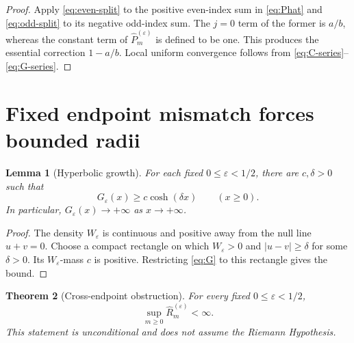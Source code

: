 \documentclass[11pt]{amsart}
\newtheorem{theorem}{Theorem}[section]
\newtheorem{lemma}[theorem]{Lemma}
\theoremstyle{remark}
\begin{document}
\begin{proof}
Apply \eqref{eq:even-split} to the positive even-index sum in
\eqref{eq:Phat} and \eqref{eq:odd-split} to its negative odd-index sum.
The $j=0$ term of the former is $a/b$, whereas the constant term of
$\widehat P_m^{(\varepsilon)}$ is defined to be one.  This produces the
essential correction $1-a/b$.  Local uniform convergence follows from
\eqref{eq:C-series}--\eqref{eq:G-series}.
\end{proof}

\section{Fixed endpoint mismatch forces bounded radii}

\begin{lemma}[Hyperbolic growth]\label{lem:hyperbolic-growth}
For each fixed $0\leq\varepsilon<1/2$, there are $c,\delta>0$ such that
\[
G_\varepsilon(x)\geq c\cosh(\delta x)\qquad(x\geq0).
\]
In particular, $G_\varepsilon(x)\to+\infty$ as $x\to+\infty$.
\end{lemma}

\begin{proof}
The density $W_\varepsilon$ is continuous and positive away from the null
line $u+v=0$.  Choose a compact rectangle on which $W_\varepsilon>0$ and
$|u-v|\geq\delta$ for some $\delta>0$.  Its $W_\varepsilon$-mass $c$ is
positive.  Restricting \eqref{eq:G} to this rectangle gives the bound.
\end{proof}

\begin{theorem}[Cross-endpoint obstruction]\label{thm:obstruction}
For every fixed $0\leq\varepsilon<1/2$,
\begin{equation}\label{eq:bounded-radii}
\sup_{m\geq0}\widehat R_m^{(\varepsilon)}<\infty.
\end{equation}
This statement is unconditional and does not assume the Riemann Hypothesis.
\end{theorem}
\end{document}
